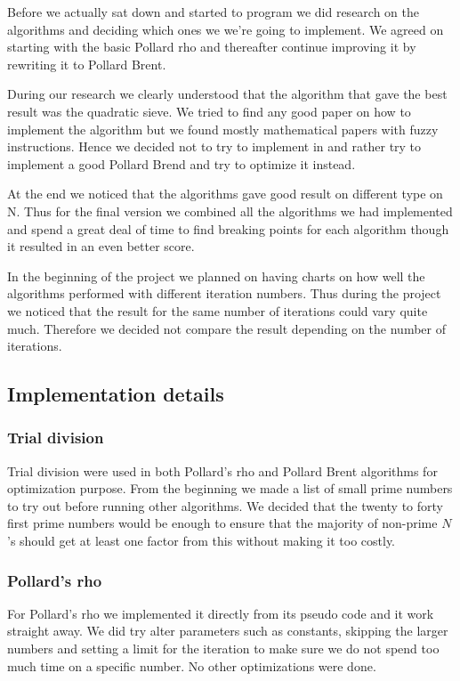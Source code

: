 Before we actually sat down and started to program we did research on the algorithms and deciding which ones we we’re going to implement. We agreed on starting with the basic Pollard rho and thereafter continue improving it by rewriting it to Pollard Brent.

During our research we clearly understood that the algorithm that gave the best result was the quadratic sieve. We tried to find any good paper on how to implement the algorithm but we found mostly mathematical papers with fuzzy instructions. Hence we decided not to try to implement in and rather try to implement a good Pollard Brend and try to optimize it instead.

At the end we noticed that the algorithms gave good result on different type on N. Thus for the final version we combined all the algorithms we had implemented and spend a great deal of time to find breaking points for each algorithm though it resulted in an even better score.

In the beginning of the project we planned on having charts on how well the algorithms performed with different iteration numbers. Thus during the project we noticed that the result for the same number of iterations could vary quite much. Therefore we decided not compare the result depending on the number of iterations.

\subsection{Implementation details}

\subsubsection{Trial division}

Trial division were used in both Pollard’s rho and Pollard Brent algorithms for optimization purpose. From the beginning we made a list of small prime numbers to try out before running other algorithms. We decided that the twenty to forty first prime numbers would be enough to ensure that the majority of non-prime $N$’s should get at least one factor from this without making it too costly.

\subsubsection{Pollard’s rho}

For Pollard’s rho we implemented it directly from its pseudo code and it work straight away. We did try alter parameters such as constants, skipping the larger numbers and setting a limit for the iteration to make sure we do not spend too much time on a specific number. No other optimizations were done. 

